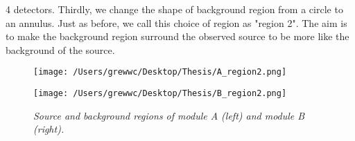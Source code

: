 \documentclass[12pt]{report}
\newcommand{\mycaption}[1]{\caption{\textit{\footnotesize #1}}}
\begin{document}
        4 detectors. Thirdly, we change the shape of background region from a circle to an annulus. Just as before, 
        we call this choice of region as "region 2". The aim is to 
        make the background region surround the observed source to be more like the background of the source.\\ 
        \begin{figure}[!ht]
          \begin{minipage}{0.45\textwidth}
            \begin{center} 
                \texttt{[image: /Users/grewwc/Desktop/Thesis/A\_region2.png]}
            \end{center}
            \end{minipage}
          \begin{minipage}{0.45\textwidth}
            \begin{center}
            \texttt{[image: /Users/grewwc/Desktop/Thesis/B\_region2.png]}
            \end{center}
          \end{minipage}
          \centering
          \begin{minipage}{0.8\textwidth}
          \mycaption{Source and background regions of module A (left) and module B (right).}
          \label{fig:region2}
          \end{minipage}
        \end{figure}
        
\end{document}
